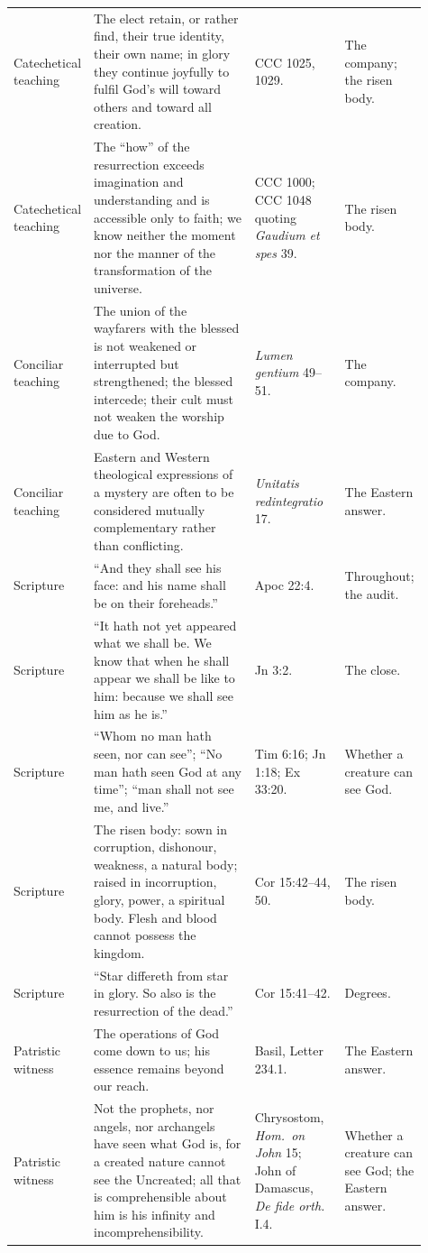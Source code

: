 \begin{longtable}{>{\raggedright\arraybackslash}p{0.13\linewidth}>{\raggedright\arraybackslash}p{0.40\linewidth}>{\raggedright\arraybackslash}p{0.22\linewidth}>{\raggedright\arraybackslash}p{0.16\linewidth}}
Catechetical teaching & The elect retain, or rather find, their true identity, their own name; in glory they continue joyfully to fulfil God's will toward others and toward all creation. & CCC 1025, 1029. & The company; the risen body.\\
Catechetical teaching & The ``how'' of the resurrection exceeds imagination and understanding and is accessible only to faith; we know neither the moment nor the manner of the transformation of the universe. & CCC 1000; CCC 1048 quoting \emph{Gaudium et spes} 39. & The risen body.\\
Conciliar teaching & The union of the wayfarers with the blessed is not weakened or interrupted but strengthened; the blessed intercede; their cult must not weaken the worship due to God. & \emph{Lumen gentium} 49--51. & The company.\\
Conciliar teaching & Eastern and Western theological expressions of a mystery are often to be considered mutually complementary rather than conflicting. & \emph{Unitatis redintegratio} 17. & The Eastern answer.\\
Scripture & ``And they shall see his face: and his name shall be on their foreheads.'' & Apoc 22:4. & Throughout; the audit.\\
Scripture & ``It hath not yet appeared what we shall be. We know that when he shall appear we shall be like to him: because we shall see him as he is.'' & 1 Jn 3:2. & The close.\\
Scripture & ``Whom no man hath seen, nor can see''; ``No man hath seen God at any time''; ``man shall not see me, and live.'' & 1 Tim 6:16; Jn 1:18; Ex 33:20. & Whether a creature can see God.\\
Scripture & The risen body: sown in corruption, dishonour, weakness, a natural body; raised in incorruption, glory, power, a spiritual body. Flesh and blood cannot possess the kingdom. & 1 Cor 15:42--44, 50. & The risen body.\\
Scripture & ``Star differeth from star in glory. So also is the resurrection of the dead.'' & 1 Cor 15:41--42. & Degrees.\\
Patristic witness & The operations of God come down to us; his essence remains beyond our reach. & Basil, Letter 234.1. & The Eastern answer.\\
Patristic witness & Not the prophets, nor angels, nor archangels have seen what God is, for a created nature cannot see the Uncreated; all that is comprehensible about him is his infinity and incomprehensibility. & Chrysostom, \emph{Hom.\ on John} 15; John of Damascus, \emph{De fide orth.} I.4. & Whether a creature can see God; the Eastern answer.\\

\end{longtable}

